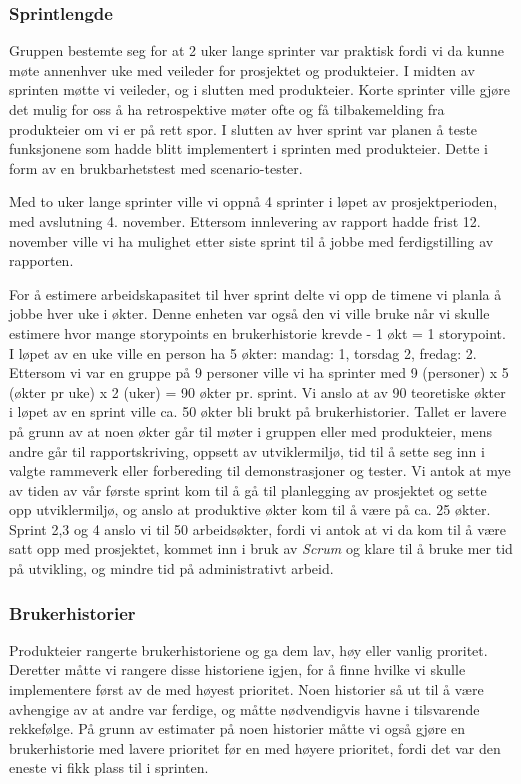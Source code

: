 \documentclass[12pt,a4paper,norsk]{article}
\begin{document}
	\subsubsection{Sprintlengde}
	Gruppen bestemte seg for at 2 uker lange sprinter var praktisk fordi vi da kunne møte annenhver uke med veileder for prosjektet og produkteier. I midten av sprinten møtte vi veileder, og i slutten med produkteier. Korte sprinter ville gjøre det mulig for oss å ha retrospektive møter ofte og få tilbakemelding fra produkteier om vi er på rett spor. I slutten av hver sprint var planen å teste funksjonene som hadde blitt implementert i sprinten med produkteier. Dette i form av en brukbarhetstest med scenario-tester.

    Med to uker lange sprinter ville vi oppnå 4 sprinter i løpet av prosjektperioden, med avslutning 4. november. Ettersom innlevering av rapport hadde frist 12. november ville vi ha mulighet etter siste sprint til å jobbe med ferdigstilling av rapporten. 

    For å estimere arbeidskapasitet til hver sprint delte vi opp de timene vi planla å jobbe hver uke i økter. Denne enheten var også den vi ville bruke når vi skulle estimere hvor mange storypoints en brukerhistorie krevde - 1 økt = 1 storypoint. I løpet av en uke ville en person ha 5 økter: mandag: 1, torsdag 2, fredag: 2. Ettersom vi var en gruppe på 9 personer ville vi ha sprinter med 9 (personer) x 5 (økter pr uke) x 2 (uker) = 90 økter pr. sprint. Vi anslo at av 90 teoretiske økter i løpet av en sprint ville ca. 50 økter bli brukt på brukerhistorier. Tallet er lavere på grunn av at noen økter går til møter i gruppen eller med produkteier, mens andre går til rapportskriving, oppsett av utviklermiljø, tid til å sette seg inn i valgte rammeverk eller forbereding til demonstrasjoner og tester. Vi antok at mye av tiden av vår første sprint kom til å gå til planlegging av prosjektet og sette opp utviklermiljø, og anslo at produktive økter kom til å være på ca. 25 økter. Sprint 2,3 og 4 anslo vi til 50 arbeidsøkter, fordi vi antok at vi da kom til å være satt opp med prosjektet, kommet inn i bruk av \textit{Scrum} og klare til å bruke mer tid på utvikling, og mindre tid på administrativt arbeid.

	\subsubsection{Brukerhistorier}
	Produkteier rangerte brukerhistoriene og ga dem lav, høy eller vanlig proritet. Deretter måtte vi rangere disse historiene igjen, for å finne hvilke vi skulle implementere først av de med høyest prioritet. Noen historier så ut til å være avhengige av at andre var ferdige, og måtte nødvendigvis havne i tilsvarende rekkefølge. På grunn av estimater på noen historier måtte vi også gjøre en brukerhistorie med lavere prioritet før en med høyere prioritet, fordi det var den eneste vi fikk plass til i sprinten. 
\end{document}

